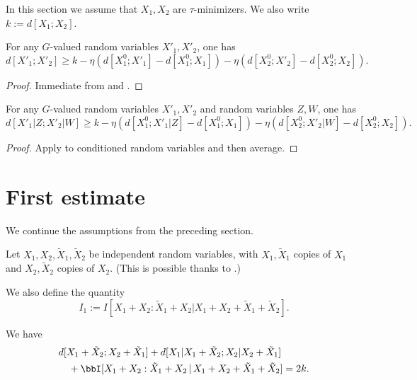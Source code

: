 In this section we assume that $X_1,X_2$ are $\tau$-minimizers. We also write $k := d[X_1;X_2]$.

\begin{lemma}\label{distance-lower}
  \leanok
  For any $G$-valued random variables $X'_1,X'_2$, one has
$$ d[X'_1;X'_2] \geq k - \eta (d[X^0_1;X'_1] - d[X^0_1;X_1] ) - \eta (d[X^0_2;X'_2] - d[X^0_2;X_2] ).$$
\end{lemma}

\begin{proof}
  \leanok
  Immediate from  and .
\end{proof}

\begin{lemma}\label{cond-distance-lower}
  \leanok
  For any $G$-valued random variables $X'_1,X'_2$ and random variables $Z,W$, one has
$$ d[X'_1|Z;X'_2|W] \geq k - \eta (d[X^0_1;X'_1|Z] - d[X^0_1;X_1] ) - \eta (d[X^0_2;X'_2|W] - d[X^0_2;X_2] ).$$
\end{lemma}

\begin{proof}\leanok  Apply  to conditioned random variables and then average.
\end{proof}

\section{First estimate}

We continue the assumptions from the preceding section.

Let $X_1, X_2, \tilde X_1, \tilde X_2$ be independent random variables, with $X_1,\tilde X_1$ copies of $X_1$ and $X_2,\tilde X_2$ copies of $X_2$.  (This is possible thanks to .)

We also define the quantity
$$ I_1 :=  I [X_1+X_2 : \tilde X_1 + X_2 | X_1+X_2+\tilde X_1+\tilde X_2].$$

\begin{lemma}\label{first-fibre}
  \leanok
  We have
  \begin{align*}
    &   d[X_1+\tilde X_2;X_2+\tilde X_1] + d[X_1|X_1+\tilde X_2; X_2|X_2+\tilde X_1] \\
    &\quad + \bbI[X_1+ X_2 : \tilde X_1 + X_2 \,|\, X_1 + X_2 + \tilde X_1 + \tilde X_2] = 2k.
  \end{align*}
\end{lemma}

